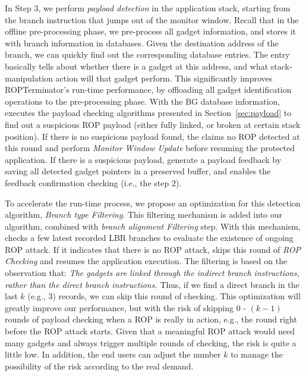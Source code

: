 In Step 3, we perform {\em payload detection} in the application stack,
starting from the branch instruction that jumps
out of the monitor window. Recall that in the offline pre-processing phase, we pre-process all gadget information,
and stores it with branch information in databases. Given the destination address
of the branch, we can quickly find out the corresponding database entries. The entry
basically tells \name about whether there is a gadget at this address, and what stack-manipulation
action will that gadget perform. This significantly improves ROPTerminator's run-time performance,
by offloading all gadget identification operations to the pre-processing phase.
With the BG database information, \name executes the payload checking algorithms
presented in Section~\ref{sec:payload} to find out a suspicious ROP payload (either fully linked,
or broken at certain stack position). If there is no suspicious payload found, the \name
claims no ROP detected at this round and perform {\em Monitor Window Update} before resuming
the protected application.
If there is a suspicious payload, \name generate a payload feedback by saving all detected gadget pointers in a preserved buffer, and enables the feedback confirmation checking (i.e., the step 2).



To accelerate the run-time process, we propose an optimization for this detection
algorithm, {\em Branch type Filtering}. This filtering mechanism is added into our
algorithm, combined with {\em branch alignment Filtering} step.
With this mechanism, \name checks a few latest recorded LBR branches
to evaluate the existence of ongoing ROP attack. If it indicates that there is no ROP attack, \name skips this round of {\em
ROP Checking} and resumes the application execution.
The filtering is based on the observation that:
\emph{The gadgets are linked through the indirect branch instructions, rather than the direct branch instructions.}
Thus, if we find a direct branch in the last $k$ (e.g., 3) records, we can skip this round of checking.
This optimization will greatly improve our performance,
but with the risk of skipping $0$ - $(k - 1)$ rounds of payload checking
when a ROP is really in action, e.g., the round right before the
ROP attack starts. Given that a meaningful ROP attack would need
many gadgets and always trigger multiple rounds
of checking, the risk is quite a little low. In addition, the end users can adjust the number $k$ to manage the possibility of the risk according to the real demand.
